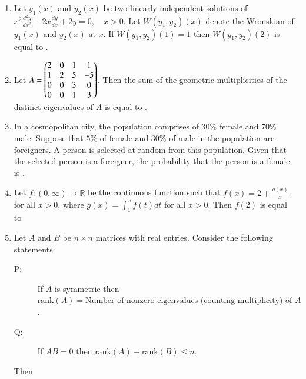\documentclass[a4paper,10pt]{article}
\begin{document}
\begin{enumerate}
\hfill{}

\item Let $y_1(x)$ and $y_2(x)$ be two linearly independent solutions of
$x^2 \frac{d^2 y}{dx^2} - 2x \frac{dy}{dx} + 2y = 0, \quad x>0$.
Let $W(y_1, y_2)(x)$ denote the Wronskian of $y_1(x)$ and $y_2(x)$ at $x$.
If $W(y_1, y_2)(1) = 1$ then $W(y_1, y_2)(2)$ is equal to \underline{\hspace{2cm}}.

\hfill{}

\item Let $A = \begin{pmatrix}2 & 0 & 1 & 1 \\ 1 & 2 & 5 & -5 \\ 0 & 0 & 3 & 0 \\ 0 & 0 & 1 & 3\end{pmatrix}$. Then the sum of the geometric multiplicities of the distinct eigenvalues of $A$ is equal to \underline{\hspace{2cm}}.

\hfill{}

\item In a cosmopolitan city, the population comprises of $30\%$ female and $70\%$ male. Suppose that $5\%$ of female and $30\%$ of male in the population are foreigners. A person is selected at random from this population. Given that the selected person is a foreigner, the probability that the person is a female is \underline{\hspace{2cm}} .

\hfill{}

\item Let $f \colon (0, \infty) \to \mathbb{R}$ be the continuous function such that $f(x) = 2 + \frac{g(x)}{x}$ for all $x>0$, where $g(x) = \int_{1}^{x} f(t) dt$ for all $x>0$. Then $f(2)$ is equal to

\hfill{}
\begin{enumerate}
\end{enumerate}

\item Let $A$ and $B$ be $n \times n$ matrices with real entries.
Consider the following statements:
\begin{description}
    \item[P:] If $A$ is symmetric then $\text{rank}(A) = \text{Number of nonzero eigenvalues (counting multiplicity) of } A$.
    \item[Q:] If $AB = 0$ then $\text{rank}(A) + \text{rank}(B) \leq n$.
\end{description}
Then


\end{enumerate}
\end{document}
